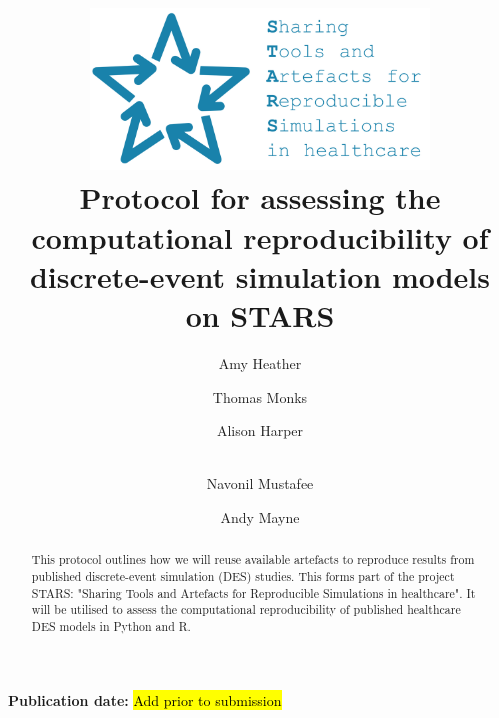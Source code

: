 \title{
    \vspace{-1.2cm}
    \includegraphics[width=9cm]{images/stars_logo_blue_text.png}\\[1cm]
    \textbf{Protocol for assessing the computational reproducibility of discrete-event simulation models on STARS}
}

\author[1]{ Amy Heather}
\author[1]{ Thomas Monks}
\author[2]{ Alison Harper}
\author[2]{\\  Navonil Mustafee}
\author[3]{ Andy Mayne}


\date{}

\maketitle

\textbf{Publication date:} \hl{Add prior to submission}

\vspace{0.5cm}

\begin{shaded}
    \begin{abstract}
        This protocol outlines how we will reuse available artefacts to reproduce results from published discrete-event simulation (DES) studies. This forms part of the project STARS: "Sharing Tools and Artefacts for Reproducible Simulations in healthcare". It will be utilised to assess the computational reproducibility of published healthcare DES models in Python and R.
    \end{abstract}
\end{shaded}

